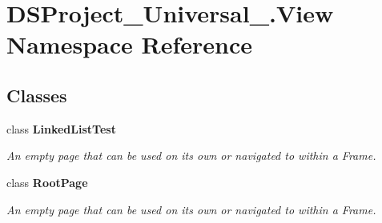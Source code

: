 \section{D\+S\+Project\+\_\+\+Universal\+\_\+.\+View Namespace Reference}
\label{namespace_d_s_project___universal___1_1_view}
\subsection*{Classes}
\begin{DoxyCompactItemize}
\item 
class \textbf{ Linked\+List\+Test}
\begin{DoxyCompactList}\small\item\em An empty page that can be used on its own or navigated to within a Frame. \end{DoxyCompactList}\item 
class \textbf{ Root\+Page}
\begin{DoxyCompactList}\small\item\em An empty page that can be used on its own or navigated to within a Frame. \end{DoxyCompactList}\end{DoxyCompactItemize}
